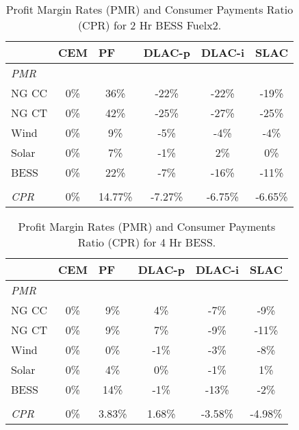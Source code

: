 \documentclass{article}
\begin{document}
\begin{table}[ht]
\centering
\begin{tabular}{lccccc}
\toprule
& \multicolumn{1}{l}{\textbf{CEM}} 
& \multicolumn{1}{l}{\textbf{PF}} 
& \multicolumn{1}{l}{\textbf{DLAC-p}} 
& \multicolumn{1}{l}{\textbf{DLAC-i}} 
& \multicolumn{1}{l}{\textbf{SLAC}} 
 \\ \hline
\midrule
\textit{PMR} & & & & \\
\quad NG CC & 0\% & 36\% & -22\% & -22\% & -19\% \\
\quad NG CT & 0\% & 42\% & -25\% & -27\% & -25\% \\
\quad Wind & 0\% & 9\% & -5\% & -4\% & -4\% \\
\quad Solar & 0\% & 7\% & -1\% & 2\% & 0\% \\
\quad BESS & 0\% & 22\% & -7\% & -16\% & -11\% \\
& & & & \\
\textit{CPR} & 0\% & 14.77\% & -7.27\% & -6.75\% & -6.65\% \\
\bottomrule
\end{tabular}
\caption{Profit Margin Rates (PMR) and Consumer Payments Ratio (CPR) for 2 Hr BESS Fuelx2.}
\label{table:2_Hr_BESS_Fuelx2_pmr}
\end{table}

\begin{table}[ht]
\centering
\begin{tabular}{lccccc}
\toprule
& \multicolumn{1}{l}{\textbf{CEM}} 
& \multicolumn{1}{l}{\textbf{PF}} 
& \multicolumn{1}{l}{\textbf{DLAC-p}} 
& \multicolumn{1}{l}{\textbf{DLAC-i}} 
& \multicolumn{1}{l}{\textbf{SLAC}} 
 \\ \hline
\midrule
\textit{PMR} & & & & \\
\quad NG CC & 0\% & 9\% & 4\% & -7\% & -9\% \\
\quad NG CT & 0\% & 9\% & 7\% & -9\% & -11\% \\
\quad Wind & 0\% & 0\% & -1\% & -3\% & -8\% \\
\quad Solar & 0\% & 4\% & 0\% & -1\% & 1\% \\
\quad BESS & 0\% & 14\% & -1\% & -13\% & -2\% \\
& & & & \\
\textit{CPR} & 0\% & 3.83\% & 1.68\% & -3.58\% & -4.98\% \\
\bottomrule
\end{tabular}
\caption{Profit Margin Rates (PMR) and Consumer Payments Ratio (CPR) for 4 Hr BESS.}
\label{table:4_Hr_BESS_pmr}
\end{table}
\end{document}
